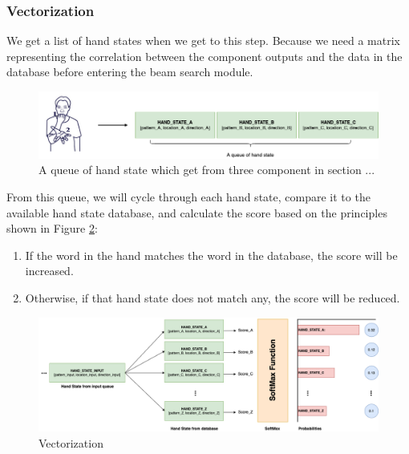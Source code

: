 \subsubsection{ Vectorization }

We get a list of hand states when we get to this step. Because we need a matrix representing the correlation between the component outputs and the data in the database before entering the beam search module.

\begin{figure}[H]
  \centering
  \includegraphics[width=\textwidth]{img/Chap4/HandStateQueue.png}
  \caption{A queue of hand state which get from three component in section ... }
  \label{fig:Chap4-HandStateQueue}
\end{figure}

From this queue, we will cycle through each hand state, compare it to the available hand state database, and calculate the score based on the principles shown in Figure \ref{fig:Chap4-Vectorization}:

\begin{enumerate}
  \item If the word in the hand matches the word in the database, the score will be increased.
  \item Otherwise, if that hand state does not match any, the score will be reduced.
\end{enumerate}

\begin{figure}[H]
  \centering
  \includegraphics[width=\textwidth]{img/Chap4/Vectorization.png}
  \caption{ Vectorization }
  \label{fig:Chap4-Vectorization}
\end{figure}


